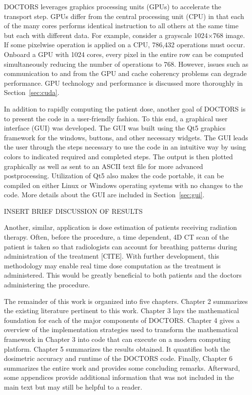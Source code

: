 DOCTORS leverages graphics processing units (GPUs) to accelerate the transport step. GPUs differ from the central processing unit (CPU) in that each of the many cores performs identical instruction to all others at the same time but each with different data. For example, consider a grayscale 1024$\times$768 image. If some pixelwise operation is applied on a CPU, 786,432 operations must occur. Onboard a GPU with 1024 cores, every pixel in the entire row can be computed simultaneously reducing the number of operations to 768. However, issues such as communication to and from the GPU and cache coherency problems can degrade performance. GPU technology and performance is discussed more thoroughly in Section~\ref{sec:cuda}.

In addition to rapidly computing the patient dose, another goal of DOCTORS is to present the code in a user-friendly fashion. To this end, a graphical user interface (GUI) was developed. The GUI was built using the Qt5 graphics framework for the windows, buttons, and other necessary widgets. The GUI leads the user through the steps necessary to use the code in an intuitive way by using colors to indicated required and completed steps. The output is then plotted graphically as well as sent to an ASCII text file for more advanced postprocessing. Utilization of Qt5 also makes the code portable, it can be compiled on either Linux or Windows operating systems with no changes to the code. More details about the GUI are included in Section~\ref{sec:gui}.

INSERT BRIEF DISCUSSION OF RESULTS

Another, similar, application is dose estimation of patients receiving radiation therapy. Often, before the procedure, a time dependent, 4D CT scan of the patient is taken so that radiologists can account for breathing patterns during administration of the treatment [CITE]. With further development, this methodology may enable real time dose computation as the treatment is administered. This would be greatly beneficial to both patients and the doctors administering the procedure.

The remainder of this work is organized into five chapters. Chapter 2 summarizes the existing literature pertinent to this work. Chapter 3 lays the mathematical foundation for each of the major components of DOCTORS. Chapter 4 gives a overview of the implementation strategies used to transform the mathematical framework in Chapter 3 into code that can execute on a modern computing platform. Chapter 5 summarizes the results obtained. It quantifies both the dosimetric accuracy and runtime of the DOCTORS code. Finally, Chapter 6 summarizes the entire work and provides some concluding remarks. Afterward, some appendices provide additional information that was not included in the main text but may still be helpful to a reader. 

\endinput
